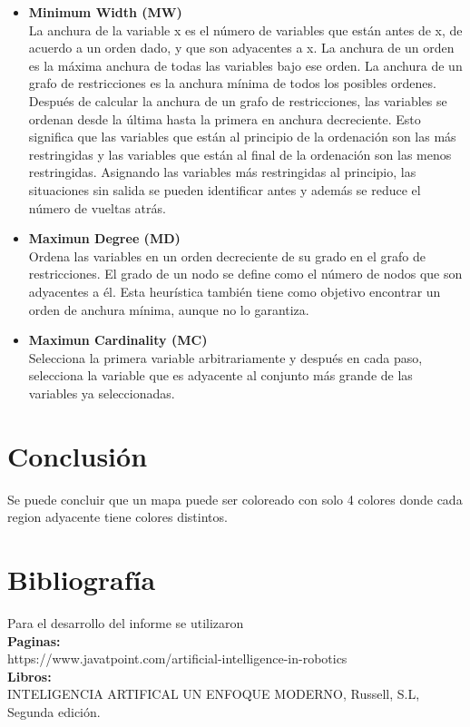 \documentclass[a4paper]{article}
\begin{document}
\begin{itemize}	
	
\item \textbf{Minimum Width (MW)}\\
La anchura de la variable x es el número de variables que están antes de x, de acuerdo a un orden dado, y que son adyacentes a x. La anchura de un orden es la máxima anchura de todas las variables bajo ese orden. La anchura de un grafo de restricciones es la anchura mínima de todos los posibles ordenes. Después de calcular la anchura de un grafo de restricciones, las variables se ordenan desde la última hasta la primera en anchura decreciente. Esto significa que las variables que están al principio de la ordenación son las más restringidas y las variables que están al final de la ordenación son las menos restringidas. Asignando las variables más restringidas al principio, las situaciones sin salida se pueden identificar antes y además se reduce el número de vueltas atrás.

\item \textbf{Maximun Degree (MD)}\\
Ordena las variables en un orden decreciente de su grado en el grafo de restricciones. El grado de un nodo se define como el número de nodos que son adyacentes a él. Esta heurística también tiene como objetivo encontrar un orden de anchura mínima, aunque no lo garantiza.

\item \textbf{Maximun Cardinality (MC)}\\
Selecciona la primera variable arbitrariamente y después en cada paso, selecciona la variable que es adyacente al conjunto más grande de las variables ya seleccionadas.

\end{itemize}


\section{Conclusi\'on}
Se puede concluir que un mapa puede ser coloreado con solo 4 colores donde cada region adyacente tiene colores distintos.
\section{Bibliograf\'ia}

Para el desarrollo del informe se utilizaron\\
\textbf{Paginas:}\\
https://www.javatpoint.com/artificial-intelligence-in-robotics\\ 
\textbf{Libros:}\\
INTELIGENCIA ARTIFICAL UN ENFOQUE MODERNO, Russell, S.L, Segunda edición.
\end{document}
